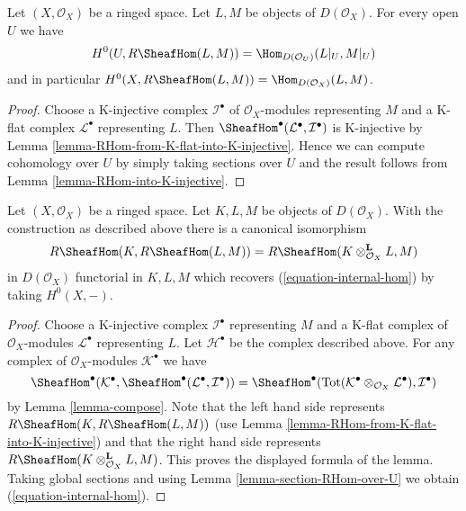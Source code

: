 \begin{lemma}
\label{lemma-section-RHom-over-U}
Let $(X, \mathcal{O}_X)$ be a ringed space. Let $L, M$ be objects
of $D(\mathcal{O}_X)$. For every open $U$ we have
$$
H^0(U, R\SheafHom(L, M)) =
\Hom_{D(\mathcal{O}_U)}(L|_U, M|_U)
$$
and in particular $H^0(X, R\SheafHom(L, M)) = \Hom_{D(\mathcal{O}_X)}(L, M)$.
\end{lemma}

\begin{proof}
Choose a K-injective complex $\mathcal{I}^\bullet$ of
$\mathcal{O}_X$-modules representing $M$ and a K-flat complex
$\mathcal{L}^\bullet$ representing $L$. Then
$\SheafHom^\bullet(\mathcal{L}^\bullet, \mathcal{I}^\bullet)$
is K-injective by Lemma \ref{lemma-RHom-from-K-flat-into-K-injective}.
Hence we can compute cohomology over $U$ by simply taking sections over $U$
and the result follows from Lemma \ref{lemma-RHom-into-K-injective}.
\end{proof}

\begin{lemma}
\label{lemma-internal-hom}
Let $(X, \mathcal{O}_X)$ be a ringed space. Let $K, L, M$ be objects
of $D(\mathcal{O}_X)$. With the construction as described above
there is a canonical isomorphism
$$
R\SheafHom(K, R\SheafHom(L, M)) =
R\SheafHom(K \otimes_{\mathcal{O}_X}^\mathbf{L} L, M)
$$
in $D(\mathcal{O}_X)$ functorial in $K, L, M$
which recovers (\ref{equation-internal-hom}) by taking $H^0(X, -)$.
\end{lemma}

\begin{proof}
Choose a K-injective complex $\mathcal{I}^\bullet$ representing
$M$ and a K-flat complex of $\mathcal{O}_X$-modules $\mathcal{L}^\bullet$
representing $L$. Let $\mathcal{H}^\bullet$ be the complex described above.
For any complex of $\mathcal{O}_X$-modules $\mathcal{K}^\bullet$
we have
$$
\SheafHom^\bullet(\mathcal{K}^\bullet,
\SheafHom^\bullet(\mathcal{L}^\bullet, \mathcal{I}^\bullet))
=
\SheafHom^\bullet(
\text{Tot}(\mathcal{K}^\bullet \otimes_{\mathcal{O}_X} \mathcal{L}^\bullet),
\mathcal{I}^\bullet)
$$
by Lemma \ref{lemma-compose}.
Note that the left hand side represents
$R\SheafHom(K, R\SheafHom(L, M))$ (use
Lemma \ref{lemma-RHom-from-K-flat-into-K-injective})
and that the right hand side represents
$R\SheafHom(K \otimes_{\mathcal{O}_X}^\mathbf{L} L, M)$.
This proves the displayed formula of the lemma.
Taking global sections and using Lemma \ref{lemma-section-RHom-over-U}
we obtain (\ref{equation-internal-hom}).
\end{proof}

